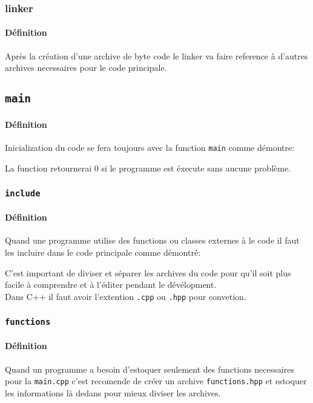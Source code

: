 \documentclass{article}
\begin{document}
\subsubsection{linker}
\paragraph{Définition}Après la création d'une archive de byte code le linker va faire reference à d'autres archives necessaires pour le code principale.

\subsection{\texttt{main}}
\paragraph{Définition}Inicialization du code se fera toujours avec la function \texttt{main} comme démontre:
\begin{scriptsize}
    \mycode
\end{scriptsize}
La function retournerai 0 si le programme est éxecute sans aucune problème.

\subsubsection{\texttt{include}}
\paragraph{Définition}Quand une programme utilise des functions ou classes externes à le code il faut les incluire dans le code principale comme démontré:
\begin{scriptsize}
    \mycode
\end{scriptsize}
C'est important de diviser et séparer les archives du code pour qu'il soit plus facile à comprendre et à l'éditer pendant le dévélopment.\\

\noindent Dans C++ il faut avoir l'extention \texttt{.cpp} ou \texttt{.hpp} pour convetion.

\subsubsection{\texttt{functions}}
\paragraph{Définition}Quand un programme a besoin d'estoquer seulement des functions necessaires pour la \texttt{main.cpp} c'est recomende de créer un archive \texttt{functions.hpp} et estoquer les informations là dedans pour mieux diviser les archives.
\end{document}
